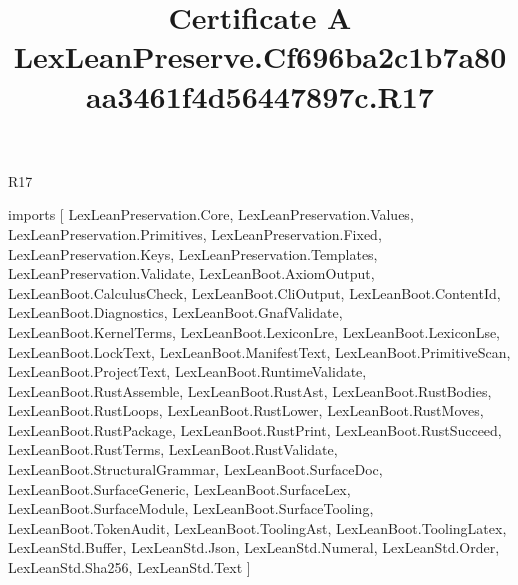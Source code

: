 \begin{lexlean}{R17}
\title{Certificate A LexLeanPreserve.Cf696ba2c1b7a80aa3461f4d56447897c.R17}
\begin{coremodule}
imports [
  LexLeanPreservation.Core,
  LexLeanPreservation.Values,
  LexLeanPreservation.Primitives,
  LexLeanPreservation.Fixed,
  LexLeanPreservation.Keys,
  LexLeanPreservation.Templates,
  LexLeanPreservation.Validate,
  LexLeanBoot.AxiomOutput,
  LexLeanBoot.CalculusCheck,
  LexLeanBoot.CliOutput,
  LexLeanBoot.ContentId,
  LexLeanBoot.Diagnostics,
  LexLeanBoot.GnafValidate,
  LexLeanBoot.KernelTerms,
  LexLeanBoot.LexiconLre,
  LexLeanBoot.LexiconLse,
  LexLeanBoot.LockText,
  LexLeanBoot.ManifestText,
  LexLeanBoot.PrimitiveScan,
  LexLeanBoot.ProjectText,
  LexLeanBoot.RuntimeValidate,
  LexLeanBoot.RustAssemble,
  LexLeanBoot.RustAst,
  LexLeanBoot.RustBodies,
  LexLeanBoot.RustLoops,
  LexLeanBoot.RustLower,
  LexLeanBoot.RustMoves,
  LexLeanBoot.RustPackage,
  LexLeanBoot.RustPrint,
  LexLeanBoot.RustSucceed,
  LexLeanBoot.RustTerms,
  LexLeanBoot.RustValidate,
  LexLeanBoot.StructuralGrammar,
  LexLeanBoot.SurfaceDoc,
  LexLeanBoot.SurfaceGeneric,
  LexLeanBoot.SurfaceLex,
  LexLeanBoot.SurfaceModule,
  LexLeanBoot.SurfaceTooling,
  LexLeanBoot.TokenAudit,
  LexLeanBoot.ToolingAst,
  LexLeanBoot.ToolingLatex,
  LexLeanStd.Buffer,
  LexLeanStd.Json,
  LexLeanStd.Numeral,
  LexLeanStd.Order,
  LexLeanStd.Sha256,
  LexLeanStd.Text
]


\end{coremodule}
\end{lexlean}
